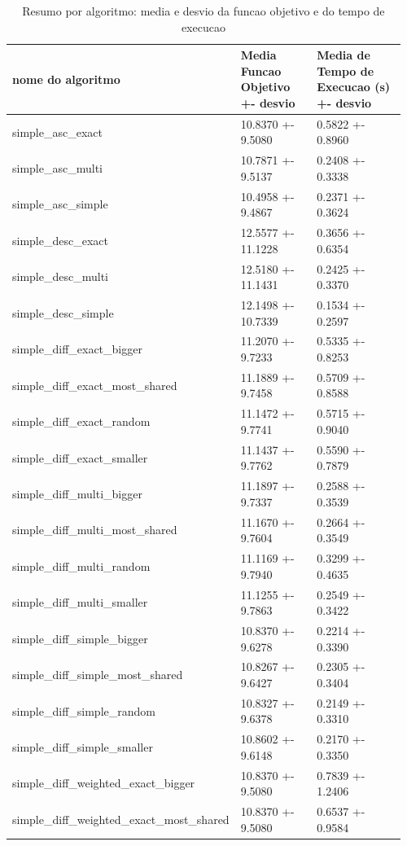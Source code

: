 \begin{table}
\caption{Resumo por algoritmo: media e desvio da funcao objetivo e do tempo de execucao}
\label{tab:resumo_algoritmos}
\begin{tabular}{p{0.42\linewidth}p{0.24\linewidth}p{0.30\linewidth}}
\toprule
nome do algoritmo & Media Funcao Objetivo +- desvio & Media de Tempo de Execucao (s) +- desvio \\
\midrule
simple\_asc\_exact & 10.8370 +- 9.5080 & 0.5822 +- 0.8960 \\
simple\_asc\_multi & 10.7871 +- 9.5137 & 0.2408 +- 0.3338 \\
simple\_asc\_simple & 10.4958 +- 9.4867 & 0.2371 +- 0.3624 \\
simple\_desc\_exact & 12.5577 +- 11.1228 & 0.3656 +- 0.6354 \\
simple\_desc\_multi & 12.5180 +- 11.1431 & 0.2425 +- 0.3370 \\
simple\_desc\_simple & 12.1498 +- 10.7339 & 0.1534 +- 0.2597 \\
simple\_diff\_exact\_bigger & 11.2070 +- 9.7233 & 0.5335 +- 0.8253 \\
simple\_diff\_exact\_most\_shared & 11.1889 +- 9.7458 & 0.5709 +- 0.8588 \\
simple\_diff\_exact\_random & 11.1472 +- 9.7741 & 0.5715 +- 0.9040 \\
simple\_diff\_exact\_smaller & 11.1437 +- 9.7762 & 0.5590 +- 0.7879 \\
simple\_diff\_multi\_bigger & 11.1897 +- 9.7337 & 0.2588 +- 0.3539 \\
simple\_diff\_multi\_most\_shared & 11.1670 +- 9.7604 & 0.2664 +- 0.3549 \\
simple\_diff\_multi\_random & 11.1169 +- 9.7940 & 0.3299 +- 0.4635 \\
simple\_diff\_multi\_smaller & 11.1255 +- 9.7863 & 0.2549 +- 0.3422 \\
simple\_diff\_simple\_bigger & 10.8370 +- 9.6278 & 0.2214 +- 0.3390 \\
simple\_diff\_simple\_most\_shared & 10.8267 +- 9.6427 & 0.2305 +- 0.3404 \\
simple\_diff\_simple\_random & 10.8327 +- 9.6378 & 0.2149 +- 0.3310 \\
simple\_diff\_simple\_smaller & 10.8602 +- 9.6148 & 0.2170 +- 0.3350 \\
simple\_diff\_weighted\_exact\_bigger & 10.8370 +- 9.5080 & 0.7839 +- 1.2406 \\
simple\_diff\_weighted\_exact\_most\_shared & 10.8370 +- 9.5080 & 0.6537 +- 0.9584 \\

\end{tabular}
\end{table}
